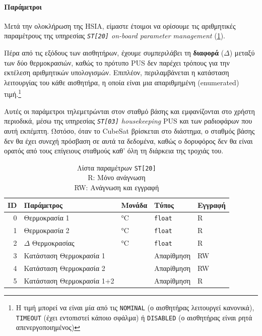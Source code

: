 \documentclass[a4paper,nobib]{tufte-book}
\begin{document}

\paragraph{Παράμετροι}

Μετά την ολοκλήρωση της \acl{HSIA}, είμαστε έτοιμοι να ορίσουμε τις αριθμητικές παραμέτρους της υπηρεσίας \emph{\texttt{ST[20]} on-board parameter management} \autocite{ECSS-E-ST-70-41C} (\cref{tab:demo_params}).

Πέρα από τις εξόδους των αισθητήρων, έχουμε συμπεριλάβει τη \textbf{διαφορά} (\(\Delta\)) μεταξύ των δύο θερμοκρασιών, καθώς το πρότυπο \acs{PUS} δεν παρέχει τρόπους για την εκτέλεση αριθμητικών υπολογισμών. Επιπλέον, περιλαμβάνεται η κατάσταση λειτουργίας του κάθε αισθητήρα, η οποία είναι μια απαριθμημένη (enumerated) τιμή.\footnote{Η τιμή μπορεί να είναι μία από τις \texttt{NOMINAL} (ο αισθητήρας λειτουργεί κανονικά), \texttt{TIMEOUT} (έχει εντοπιστεί κάποιο σφάλμα) ή \texttt{DISABLED} (ο αισθητήρας είναι ρητά απενεργοποιημένος)} 

Αυτές οι παράμετροι τηλεμετρώνται στον σταθμό βάσης και εμφανίζονται στο χρήστη περιοδικά, μέσω της υπηρεσίας \emph{\texttt{ST[03]} housekeeping} \ac{PUS} και των ραδιοφάρων που αυτή εκπέμπτη. Ωστόσο, όταν το CubeSat βρίσκεται στο διάστημα, ο σταθμός βάσης δεν θα έχει συνεχή πρόσβαση σε αυτά τα δεδομένα, καθώς ο δορυφόρος δεν θα είναι ορατός από τους επίγειους σταθμούς καθ' όλη τη διάρκεια της τροχιάς του.

\begin{table}[h]
	\centering
	\caption[Λίστα παραμέτρων \texttt{ST[20]}]{Λίστα παραμέτρων \texttt{ST[20]}\\R: Μόνο ανάγνωση\\RW: Ανάγνωση και εγγραφή}
	\label{tab:demo_params}
	\begin{tabularx}{\textwidth}{@{}rXlll@{}}
		\toprule
		ID & Παράμετρος              & Μονάδα & Τύπος & Εγγραφή \\ \midrule
		0            & Θερμοκρασία 1          & \si{\celsius}      & \texttt{float} & R     \\
		1            & Θερμοκρασία 2          & \si{\celsius}      & \texttt{float} & R    \\
		2            & \(\Delta\) Θερμοκρασίας & \si{\celsius}      & \texttt{float} & R    \\
		3            & Κατάσταση Θερμοκρασία 1         &       & Απαρίθμηση   & RW  \\
		4            & Κατάσταση Θερμοκρασία 2         &       & Απαρίθμηση   & RW  \\
		5			 & Κατάσταση Θερμοκρασία 1+2       &		& Απαρίθμηση   & R  \\ \bottomrule
	\end{tabularx}
\end{table}
\end{document}
